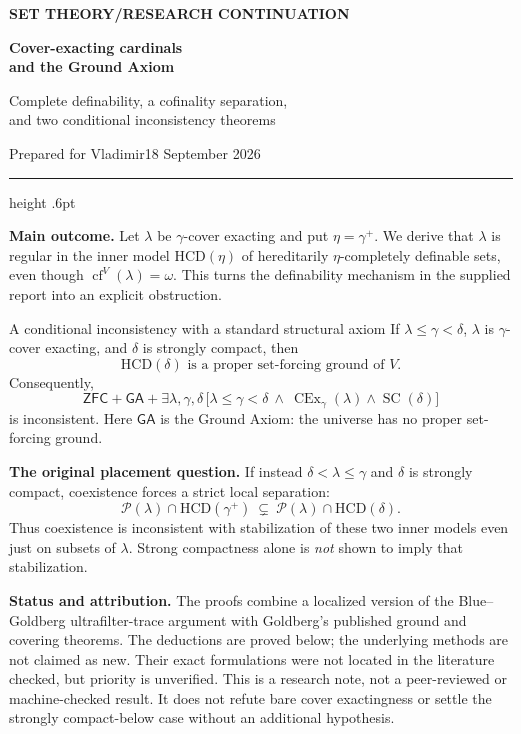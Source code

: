 \documentclass[11pt,letterpaper]{article}
\theoremstyle{definition}
\newcommand{\ZFC}{\mathsf{ZFC}}
\newcommand{\SC}{\operatorname{SC}}
\newcommand{\CEx}{\operatorname{CEx}}
\newcommand{\cf}{\operatorname{cf}}
\newcommand{\HCD}{\mathrm{HCD}}
\newcommand{\GA}{\mathsf{GA}}
\newcommand{\Pow}{\mathcal{P}}
\begin{document}
\thispagestyle{empty}
{\sffamily\bfseries\small\color{Olive}SET THEORY\quad /\quad RESEARCH CONTINUATION}

\vspace{13pt}
{\fontsize{28}{31}\selectfont\bfseries\color{Forest}Cover-exacting cardinals\\and the Ground Axiom\par}
\vspace{10pt}
{\fontsize{14}{18}\selectfont Complete definability, a cofinality separation,\\and two conditional inconsistency theorems\par}
\vspace{14pt}
{\color{Muted}Prepared for Vladimir\hfill 18 September 2026\par}
\vspace{3pt}
{\color{Sage}\hrule height .6pt}
\vspace{12pt}

\textbf{Main outcome.} Let $\lambda$ be $\gamma$-cover exacting and put $\eta=\gamma^+$. We derive that $\lambda$ is regular in the inner model $\HCD(\eta)$ of hereditarily $\eta$-completely definable sets, even though $\cf^V(\lambda)=\omega$. This turns the definability mechanism in the supplied report into an explicit obstruction.

\begin{assessment}{A conditional inconsistency with a standard structural axiom}
If $\lambda\le\gamma<\delta$, $\lambda$ is $\gamma$-cover exacting, and $\delta$ is strongly compact, then
\[
\HCD(\delta)\text{ is a proper set-forcing ground of }V.
\]
Consequently,
\[
\ZFC+\GA+\exists\lambda,\gamma,\delta\,
\bigl[\lambda\le\gamma<\delta\ \wedge\ \CEx_\gamma(\lambda)\wedge\SC(\delta)\bigr]
\]
is inconsistent. Here $\GA$ is the Ground Axiom: the universe has no proper set-forcing ground.
\end{assessment}

\textbf{The original placement question.} If instead $\delta<\lambda\le\gamma$ and $\delta$ is strongly compact, coexistence forces a strict local separation:
\[
\Pow(\lambda)\cap\HCD(\gamma^+)
\ \subsetneq\ \Pow(\lambda)\cap\HCD(\delta).
\]
Thus coexistence is inconsistent with stabilization of these two inner models even just on subsets of $\lambda$. Strong compactness alone is \emph{not} shown to imply that stabilization.

\textbf{Status and attribution.} The proofs combine a localized version of the Blue--Goldberg ultrafilter-trace argument with Goldberg's published ground and covering theorems. The deductions are proved below; the underlying methods are not claimed as new. Their exact formulations were not located in the literature checked, but priority is unverified. This is a research note, not a peer-reviewed or machine-checked result. It does not refute bare cover exactingness or settle the strongly compact-below case without an additional hypothesis.
\end{document}
